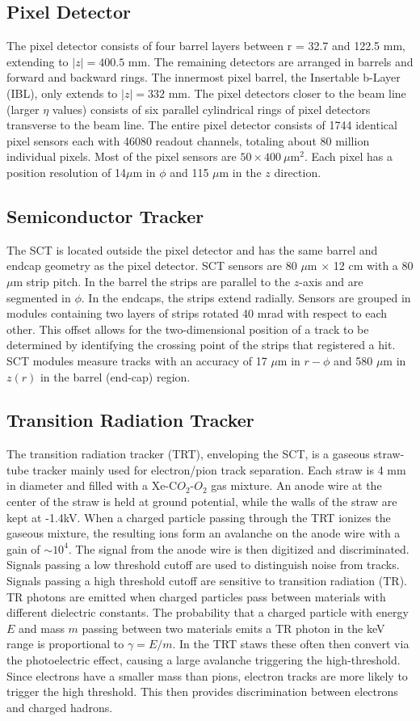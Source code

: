 \subsection{Pixel Detector}
The pixel detector consists of four barrel layers between r = 32.7 and 122.5 mm, extending to $|z|=400.5$ mm. The remaining detectors are arranged in barrels and forward and backward rings. The innermost pixel barrel, the Insertable b-Layer (IBL), only extends to $|z|=332$ mm. The pixel detectors closer to the beam line (larger $\eta$ values) consists of six parallel cylindrical rings of pixel detectors transverse to the beam line. The entire pixel detector consists of 1744 identical pixel sensors each with 46080 readout channels, totaling about 80 million individual pixels. Most of the pixel sensors are $50\times400~\mu$m$^{2}$.  Each pixel has a position resolution of 14$\mu$m in $\phi$ and 115 $\mu$m in the $z$ direction.
\subsection{Semiconductor Tracker}
The SCT is located outside the pixel detector and has the same barrel and endcap geometry as the pixel detector. SCT sensors are 80 $\mu$m $\times$ 12 cm with a 80$\mu$m strip pitch. In the barrel the strips are parallel to the $z$-axis and are segmented in $\phi$. In the endcaps, the strips extend radially. Sensors are grouped in modules containing two layers of strips rotated 40 mrad with respect to each other. This offset allows for the two-dimensional position of a track to be determined by identifying the crossing point of the strips that registered a hit. SCT modules measure tracks with an accuracy of 17 $\mu$m in $r-\phi$ and 580 $\mu$m in $z(r)$ in the barrel (end-cap) region.
\subsection{Transition Radiation Tracker}
The transition radiation tracker (TRT), enveloping the SCT, is a gaseous straw-tube tracker mainly used for electron/pion track separation. Each straw is 4 mm in diameter and filled with a Xe-C$O_{2}$-$O_{2}$ gas mixture. An anode wire at the center of the straw is held at ground potential, while the walls of the straw are kept at -1.4kV. When a charged particle passing through the TRT ionizes the gaseous mixture, the resulting ions form an avalanche on the anode wire with a gain of $\sim 10^{4}$. The signal from the anode wire is then digitized and discriminated. Signals passing a low threshold cutoff are used to distinguish noise from tracks. Signals passing a high threshold cutoff are sensitive to transition radiation (TR). TR photons are emitted when charged particles pass between materials with different dielectric constants. The probability that a charged particle with energy $E$ and mass $m$ passing between two materials emits a TR photon in the keV range is proportional to $\gamma=E/m$. In the TRT staws these often then convert via the photoelectric effect, causing a large avalanche triggering the high-threshold. Since electrons have a smaller mass than pions, electron tracks are more likely to trigger the high threshold. This then provides discrimination between electrons and charged hadrons.

